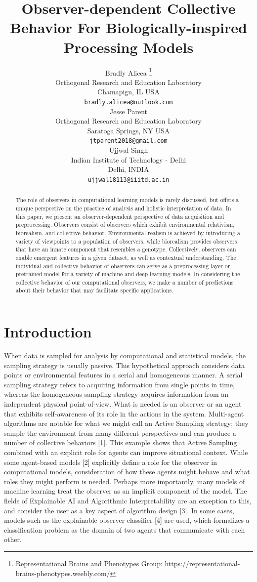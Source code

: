 \documentclass{article}
\title{Observer-dependent Collective Behavior For Biologically-inspired Processing Models}
\author{%
  Bradly Alicea \thanks{Representational Brains and Phenotypes Group: https://representational-brains-phenotypes.weebly.com/} \\
  Orthogonal Research and Education Laboratory\\
  Chamapign, IL USA \\
  \texttt{bradly.alicea@outlook.com} \\
  Jesse Parent \\
  Orthogonal Research and Education Laboratory \\
  Saratoga Springs, NY USA\\
  \texttt{jtparent2018@gmail.com} \\
  Ujjwal Singh \\
  Indian Institute of Technology - Delhi \\
  Delhi, INDIA \\
  \texttt{ujjwal18113@iiitd.ac.in} \\
}
\begin{document}
\maketitle

\begin{abstract}
  The role of observers in computational learning models is rarely discussed, but offers a unique perspective on the practice of analysis and holistic interpretation of data. In this paper,  we present an observer-dependent perspective of data acquisition and preprocessing. Observers consist of observers which exhibit environmental relativism, biorealism, and collective behavior. Environmental realism is achieved by introducing a variety of viewpoints to a population of observers, while biorealism provides observers that have an innate component that resembles a genotype. Collectively, observers can enable emergent features in a given dataset, as well as contextual understanding. The individual and collective behavior of observers can serve as a preprocessing layer or pretrained model for a variety of machine and deep learning models. In considering the collective behavior of our computational observers, we make a number of predictions about their behavior that may facilitate specific applications. 
\end{abstract}

\section{Introduction}
When data is sampled for analysis by computational and statistical models, the sampling strategy is usually passive. This hypothetical approach considers data points or environmental features in a serial and homogeneous manner. A serial sampling strategy refers to acquiring information from single points in time, whereas the homogeneous sampling strategy acquires information from an independent physical point-of-view. What is needed is an observer or an agent that exhibits self-awareness of its role in the actions in the system. Multi-agent algorithms are notable for what we might call an Active Sampling strategy: they sample the environment from many different perspectives and can produce a number of collective behaviors [1]. This example shows that Active Sampling combined with an explicit role for agents can improve situational context. While some agent-based models [2] explicitly define a role for the observer in computational models, consideration of how these agents might behave and what roles they might perform is needed. Perhaps more importantly, many models of machine learning treat the observer as an implicit component of the model. The fields of Explainable AI and Algorithmic Interpretability are an exception to this, and consider the user as a key aspect of algorithm design [3]. In some cases, models such as the explainable observer-classifier [4] are used, which formalizes a classification problem as the domain of two agents that communicate with each other.
\end{document}
